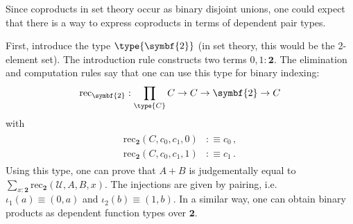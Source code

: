 
    Since coproducts in set theory occur as binary disjoint unions, one could expect that there is a way to express coproducts in terms of dependent pair types.
    \begin{construct}
        First, introduce the type $\type{\symbf{2}}$ (in set theory, this would be the 2-element set). The introduction rule constructs two terms $0,1:\symbf{2}$. The elimination and computation rules say that one can use this type for binary indexing:
        \begin{gather}
            \mathrm{rec}_{\symbf{2}}:\prod_{\type{C}}C\rightarrow C\rightarrow\symbf{2}\rightarrow C
        \end{gather}
        with
        \begin{gather}
            \begin{aligned}
                \mathrm{rec}_{\symbf{2}}(C, c_0, c_1, 0)&:\equiv c_0\,,\\
                \mathrm{rec}_{\symbf{2}}(C, c_0, c_1, 1)&:\equiv c_1\,.
            \end{aligned}
        \end{gather}
        Using this type, one can prove that $A+B$ is judgementally equal to $\sum_{x:\symbf{2}}\mathrm{rec}_{\symbf{2}}(\mathcal{U},A,B,x)$. The injections are given by pairing, i.e.~$\iota_1(a)\equiv(0,a)$ and $\iota_2(b)\equiv(1,b)$. In a similar way, one can obtain binary products as dependent function types over $\symbf{2}$.
    \end{construct}

